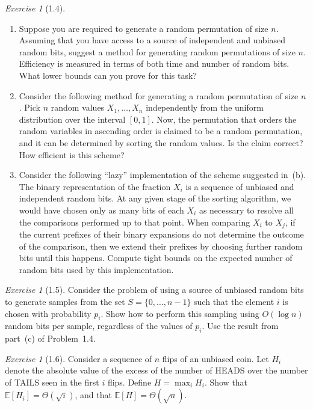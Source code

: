 \documentclass[twoside,12pt]{book}
\theoremstyle{plain}
\theoremstyle{definition}
\theoremstyle{remark}
\newtheorem{exercise}[theorem]{Exercise}
\begin{document}
\begin{exercise}[1.4]
\begin{enumerate}[label=(\alph*)]
\item Suppose you are required to generate a random permutation of size $n$.
  Assuming that you have access to a source of independent and unbiased
  random bits, suggest a method for generating random permutations of size
  $n$.  Efficiency is measured in terms of both time and number of random
  bits.  What lower bounds can you prove for this task?
\item Consider the following method for generating a random permutation of
  size $n$.  Pick $n$ random values $X_1,\ldots,X_n$ independently from the
  uniform distribution over the interval $[0,1]$.  Now, the permutation that
  orders the random variables in ascending order is claimed to be a random
  permutation, and it can be determined by sorting the random values.  Is the
  claim correct?  How efficient is this scheme?
\item Consider the following ``lazy'' implementation of the scheme suggested
  in~(b).  The binary representation of the fraction $X_i$ is a sequence of
  unbiased and independent random bits.  At any given stage of the sorting
  algorithm, we would have chosen only as many bits of each $X_i$ as
  necessary to resolve all the comparisons performed up to that point.  When
  comparing $X_i$ to $X_j$, if the current prefixes of their binary
  expansions do not determine the outcome of the comparison, then we extend
  their prefixes by choosing further random bits until this happens.  Compute
  tight bounds on the expected number of random bits used by this
  implementation.
\end{enumerate}
\end{exercise}

\begin{exercise}[1.5]
Consider the problem of using a source of unbiased random bits to generate
samples from the set $S=\{0,\ldots,n-1\}$ such that the element $i$ is
chosen with probability $p_i$.  Show how to perform this sampling using
$O(\log n)$ random bits per sample, regardless of the values of $p_i$.  Use
the result from part~(c) of Problem~1.4.
\end{exercise}

\begin{exercise}[1.6]
Consider a sequence of $n$ flips of an unbiased coin.  Let $H_i$ denote the
absolute value of the excess of the number of HEADS over the number of TAILS
seen in the first $i$ flips.  Define $H=\max_i H_i$.  Show that
$\mathbb{E}[H_i]=\Theta(\sqrt{i})$, and that
$\mathbb{E}[H]=\Theta(\sqrt{n})$.
\end{exercise}
\end{document}
